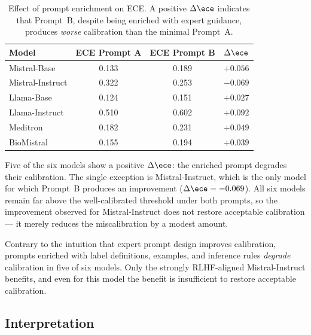 \begin{table}[htbp]
    \centering
    \caption{Effect of prompt enrichment on ECE. A positive 
        $\Delta\ece$ indicates that Prompt~B, despite being enriched with 
        expert guidance, produces \emph{worse} calibration than the 
        minimal Prompt~A.}
    \label{tab:res-prompt-comparison}
    \small
    \begin{tabular}{@{}lccc@{}}
        \toprule
        \textbf{Model} & 
        \textbf{ECE Prompt A} & 
        \textbf{ECE Prompt B} & 
        \boldmath$\Delta\ece$ \\
        \midrule
        Mistral-Base       & 0.133 & 0.189 & $+0.056$ \\
        Mistral-Instruct   & 0.322 & 0.253 & $-0.069$ \\
        Llama-Base         & 0.124 & 0.151 & $+0.027$ \\
        Llama-Instruct     & 0.510 & 0.602 & $+0.092$ \\
        Meditron           & 0.182 & 0.231 & $+0.049$ \\
        BioMistral         & 0.155 & 0.194 & $+0.039$ \\
        \bottomrule
    \end{tabular}
\end{table}

Five of the six models show a positive $\Delta\ece$: the enriched prompt 
degrades their calibration. The single exception is Mistral-Instruct, 
which is the only model for which Prompt~B produces an improvement 
($\Delta\ece = -0.069$). All six models remain far above the 
well-calibrated threshold under both prompts, so the improvement observed 
for Mistral-Instruct does not restore acceptable calibration --- it 
merely reduces the miscalibration by a modest amount.

\begin{finding}
    Contrary to the intuition that expert prompt design improves 
    calibration, prompts enriched with label definitions, examples, and 
    inference rules \emph{degrade} calibration in five of six models. 
    Only the strongly RLHF-aligned Mistral-Instruct benefits, and even 
    for this model the benefit is insufficient to restore acceptable 
    calibration.
\end{finding}

\subsection{Interpretation}
\label{subsec:res-prompt-interpretation}

